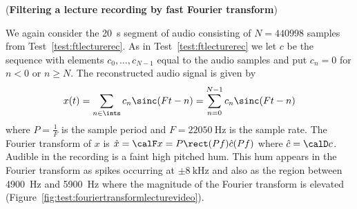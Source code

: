 \begin{test}\label{test:fftlecturerec}
(\textbf{Filtering a lecture recording by fast Fourier transform})
 
We again consider the \SI{20}{\second} segment of audio consisting of $N=440998$ samples from Test~\ref{test:ftlecturerec}.  As in Test~\ref{test:ftlecturerec} we let $c$ be the sequence with elements $c_0,\dots,c_{N-1}$ equal to the audio samples and put $c_n = 0$ for $n < 0$ or $n \geq N$.  The reconstructed audio signal is given by
\[
x(t) = \sum_{n \in \ints} c_n \sinc(Ft - n) = \sum_{n=0}^{N-1} c_n \sinc(Ft - n)
\] 
where $P = \tfrac{1}{F}$ is the sample period and $F = \SI{22050}{\hertz}$ is the sample rate.  The Fourier transform of $x$ is $\hat{x} = \calF x = P\rect(Pf)\hat{c}(Pf)$ where $\hat{c} = \calD c$.  Audible in the recording is a faint high pitched hum.  This hum appears in the Fourier transform as spikes occurring at $\pm\SI{8}{\kilo\hertz}$ and also as the region between \SI{4900}{\hertz} and \SI{5900}{\hertz} where the magnitude of the Fourier transform is elevated (Figure~\ref{fig:test:fouriertransformlecturevideo}).  


\end{test}
